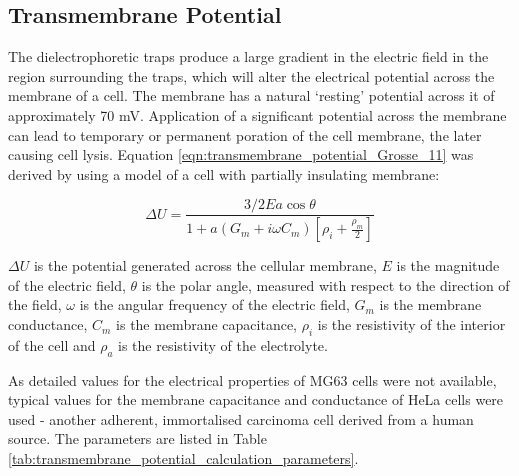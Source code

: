 \subsection{Transmembrane Potential}
\label{Section:transmembrane_potential}
The dielectrophoretic traps produce a large gradient in the electric field in the region surrounding the traps, which will alter the electrical potential across the membrane of a cell. The membrane has a natural `resting' potential across it of approximately 70 mV. Application of a significant potential across the membrane can lead to temporary or permanent poration of the cell membrane, the later causing cell lysis. Equation \ref{eqn:transmembrane_potential_Grosse_11} was derived by \cite{Grosse:1992} using a model of a cell with partially insulating membrane:

\begin{equation}
 \Delta U = \frac{3/2 Ea \cos \theta}{1 + a(G_{m} + i \omega C_{m}) \left[ \rho_{i} + \frac{\rho_{m}}{2} \right]} 
\label{eqn:transmembrane_potential_Grosse_11}
\end{equation}

$ \Delta U $ is the potential generated across the cellular membrane, $ E $ is the magnitude of the electric field, $ \theta $ is the polar angle, measured with respect to the direction of the field, $ \omega $ is the angular frequency of the electric field, $ G_{m} $ is the membrane conductance,  $ C_{m} $ is the membrane capacitance, $\rho_{i} $ is the resistivity of the interior of the cell and $ \rho_{a} $ is the resistivity of the electrolyte.

As detailed values for the electrical properties of MG63 cells were not available, typical values for the membrane capacitance and conductance of HeLa cells were used - another adherent, immortalised carcinoma cell derived from a human source. The parameters are listed in Table \ref{tab:transmembrane_potential_calculation_parameters}.

